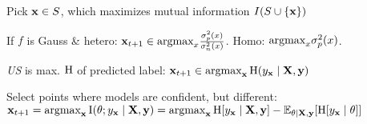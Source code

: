 \begin{definition}
    Pick \(\vb{x} \in S\), which maximizes mutual information \(I(S \cup \{\vb{x}\})\)
\end{definition}

\begin{definition}
    If \(f\) is Gauss \& hetero: \(\vb{x}_{t+1} \in \text{argmax}_{x} \frac{\sigma_p^2(x)}{\sigma_n^2(x)}\). Homo: \(\text{argmax}_{x} \sigma_p^2(x)\).
\end{definition}

\begin{definition}[Classification]
    \textit{US} is max. \(\operatorname{H}\) of predicted label:
    \(\vb{x}_{t+1}\in\text{argmax}_{\vb{x}}\operatorname{H}(y_{\vb{x}} \mid \vb{X},\vb{y})\)
\end{definition}

\begin{definition}[BALD]
    Select points where models are confident, but different:
    \(\vb{x}_{t+1} = \text{argmax}_{\vb{x}} \operatorname{I}(\theta;y_{\vb{x}} \mid \vb{X}, \vb{y}) = \text{argmax}_{\vb{x}} \operatorname{H}[y_{\vb{x}} \mid \vb{X}, \vb{y}] - \mathbb{E}_{\theta \mid \vb{X}, \vb{y}}[\operatorname{H}[y_{\vb{x}} \mid \theta]]\)
\end{definition}